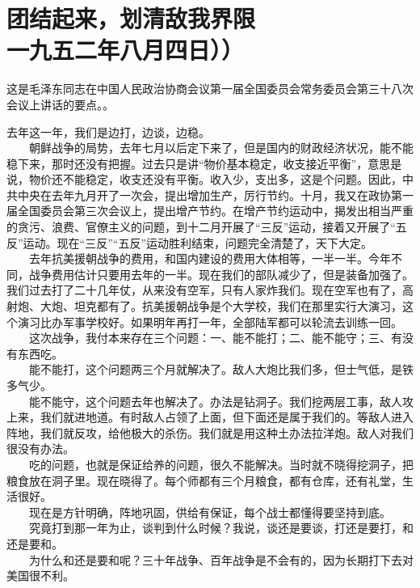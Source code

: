 \documentclass[cn,11pt,chinese]{elegantbook}
\def\myformat#1{\hfil\hfil #1}
\begin{document}
\section*{\myformat{团结起来，划清敌我界限}\\\myformat{一九五二年八月四日））}}
\begin{introduction}\item  这是毛泽东同志在中国人民政治协商会议第一届全国委员会常务委员会第三十八次会议上讲话的要点。。\end{introduction}
去年这一年，我们是边打，边谈，边稳。\\
　　朝鲜战争的局势，去年七月以后定下来了，但是国内的财政经济状况，能不能稳下来，那时还没有把握。过去只是讲“物价基本稳定，收支接近平衡”，意思是说，物价还不能稳定，收支还没有平衡。收入少，支出多，这是个问题。因此，中共中央在去年九月开了一次会，提出增加生产，厉行节约。十月，我又在政协第一届全国委员会第三次会议上，提出增产节约。在增产节约运动中，揭发出相当严重的贪污、浪费、官僚主义的问题，到十二月开展了“三反”运动，接着又开展了“五反”运动。现在“三反”“五反”运动胜利结束，问题完全清楚了，天下大定。\\
　　去年抗美援朝战争的费用，和国内建设的费用大体相等，一半一半。今年不同，战争费用估计只要用去年的一半。现在我们的部队减少了，但是装备加强了。我们过去打了二十几年仗，从来没有空军，只有人家炸我们。现在空军也有了，高射炮、大炮、坦克都有了。抗美援朝战争是个大学校，我们在那里实行大演习，这个演习比办军事学校好。如果明年再打一年，全部陆军都可以轮流去训练一回。\\
　　这次战争，我付本来存在三个问题：一、能不能打；二、能不能守；三、有没有东西吃。\\
　　能不能打，这个问题两三个月就解决了。敌人大炮比我们多，但士气低，是铁多气少。\\
　　能不能守，这个问题去年也解决了。办法是钻洞子。我们挖两层工事，敌人攻上来，我们就进地道。有时敌人占领了上面，但下面还是属于我们的。等敌人进入阵地，我们就反攻，给他极大的杀伤。我们就是用这种土办法拉洋炮。敌人对我们很没有办法。\\
　　吃的问题，也就是保证给养的问题，很久不能解决。当时就不晓得挖洞子，把粮食放在洞子里。现在晓得了。每个师都有三个月粮食，都有仓库，还有礼堂，生活很好。\\
　　现在是方针明确，阵地巩固，供给有保证，每个战士都懂得要坚持到底。\\
　　究竟打到那一年为止，谈判到什么时候？我说，谈还是要谈，打还是要打，和还是要和。\\
　　为什么和还是要和呢？三十年战争、百年战争是不会有的，因为长期打下去对美国很不利。\\
\end{document}
